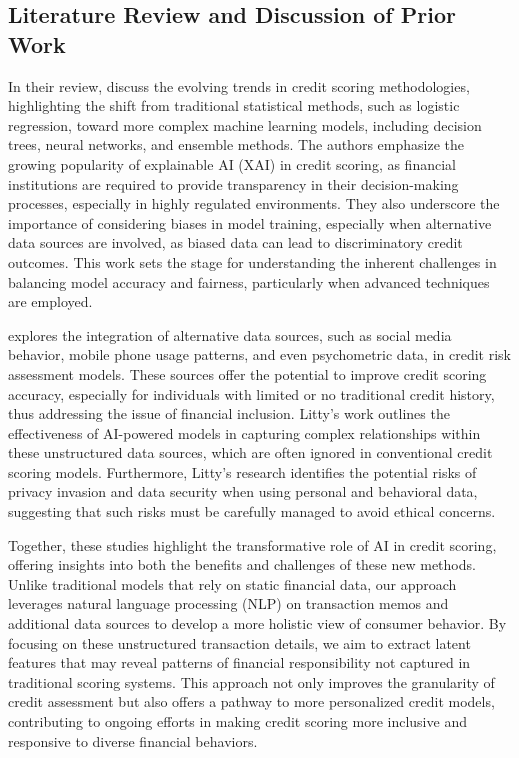 \documentclass[12pt,letterpaper]{article}
\begin{document}
\subsection{Literature Review and Discussion of Prior Work}
    {In their review, \cite{markov2022credit} discuss the evolving trends in credit scoring methodologies, highlighting the shift from traditional statistical methods, such as logistic regression, toward more complex machine learning models, including decision trees, neural networks, and ensemble methods. The authors emphasize the growing popularity of explainable AI (XAI) in credit scoring, as financial institutions are required to provide transparency in their decision-making processes, especially in highly regulated environments. They also underscore the importance of considering biases in model training, especially when alternative data sources are involved, as biased data can lead to discriminatory credit outcomes. This work sets the stage for understanding the inherent challenges in balancing model accuracy and fairness, particularly when advanced techniques are employed.
        
    \cite{litty2024beyond} explores the integration of alternative data sources, such as social media behavior, mobile phone usage patterns, and even psychometric data, in credit risk assessment models. These sources offer the potential to improve credit scoring accuracy, especially for individuals with limited or no traditional credit history, thus addressing the issue of financial inclusion. Litty’s work outlines the effectiveness of AI-powered models in capturing complex relationships within these unstructured data sources, which are often ignored in conventional credit scoring models. Furthermore, Litty’s research identifies the potential risks of privacy invasion and data security when using personal and behavioral data, suggesting that such risks must be carefully managed to avoid ethical concerns.
    
    Together, these studies highlight the transformative role of AI in credit scoring, offering insights into both the benefits and challenges of these new methods. Unlike traditional models that rely on static financial data, our approach leverages natural language processing (NLP) on transaction memos and additional data sources to develop a more holistic view of consumer behavior. By focusing on these unstructured transaction details, we aim to extract latent features that may reveal patterns of financial responsibility not captured in traditional scoring systems. This approach not only improves the granularity of credit assessment but also offers a pathway to more personalized credit models, contributing to ongoing efforts in making credit scoring more inclusive and responsive to diverse financial behaviors.
    }
    
\end{document}
